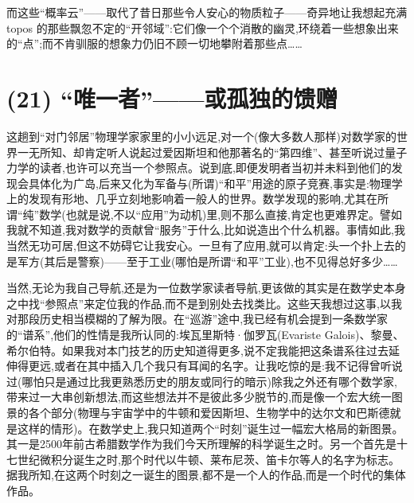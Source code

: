 而这些“概率云”——取代了昔日那些令人安心的物质粒子——奇异地让我想起充满 topos 的那些飘忽不定的“开邻域”:它们像一个个消散的幽灵,环绕着一些想象出来的“点”;而不肯驯服的想象力仍旧不顾一切地攀附着那些点……

\section{(21) “唯一者”——或孤独的馈赠}

这趟到“对门邻居”物理学家家里的小小远足,对一个(像大多数人那样)对数学家的世界一无所知、却肯定听人说起过爱因斯坦和他那著名的“第四维”、甚至听说过量子力学的读者,也许可以充当一个参照点。说到底,即便发明者当初并未料到他们的发现会具体化为广岛,后来又化为军备与(所谓)“和平”用途的原子竞赛,事实是:物理学上的发现有形地、几乎立刻地影响着一般人的世界。数学发现的影响,尤其在所谓“纯”数学(也就是说,不以“应用”为动机)里,则不那么直接,肯定也更难界定。譬如我就不知道,我对数学的贡献曾“服务”于什么,比如说造出个什么机器。事情如此,我当然无功可居,但这不妨碍它让我安心。一旦有了应用,就可以肯定:头一个扑上去的是军方(其后是警察)——至于工业(哪怕是所谓“和平”工业),也不见得总好多少……

当然,无论为我自己导航,还是为一位数学家读者导航,更该做的其实是在数学史本身之中找“参照点”来定位我的作品,而不是到别处去找类比。这些天我想过这事,以我对那段历史相当模糊的了解为限。在“巡游”途中,我已经有机会提到一条数学家的“谱系”,他们的性情是我所认同的:埃瓦里斯特·伽罗瓦(Evariste Galois)、黎曼、希尔伯特。如果我对本门技艺的历史知道得更多,说不定我能把这条谱系往过去延伸得更远,或者在其中插入几个我只有耳闻的名字。让我吃惊的是:我不记得曾听说过(哪怕只是通过比我更熟悉历史的朋友或同行的暗示)除我之外还有哪个数学家,带来过一大串创新想法,而这些想法并不是彼此多少脱节的,而是像一个宏大统一图景的各个部分(物理与宇宙学中的牛顿和爱因斯坦、生物学中的达尔文和巴斯德就是这样的情形)。在数学史上,我只知道两个“时刻”诞生过一幅宏大格局的新图景。其一是2500年前古希腊数学作为我们今天所理解的科学诞生之时。另一个首先是十七世纪微积分诞生之时,那个时代以牛顿、莱布尼茨、笛卡尔等人的名字为标志。据我所知,在这两个时刻之一诞生的图景,都不是一个人的作品,而是一个时代的集体作品。

